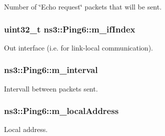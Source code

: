 Number of \char`\"{}\+Echo request\char`\"{} packets that will be sent. 

\subsubsection[{\texorpdfstring{m\+\_\+if\+Index}{m_ifIndex}}]{\setlength{\rightskip}{0pt plus 5cm}uint32\+\_\+t ns3\+::\+Ping6\+::m\+\_\+if\+Index\hspace{0.3cm}{\ttfamily [private]}}\hypertarget{classns3_1_1Ping6_a13e483e25f42538d74bebc41c31f2779}{}\label{classns3_1_1Ping6_a13e483e25f42538d74bebc41c31f2779}


Out interface (i.\+e. for link-\/local communication). 

\subsubsection[{\texorpdfstring{m\+\_\+interval}{m_interval}}]{ ns3\+::\+Ping6\+::m\+\_\+interval\hspace{0.3cm}{\ttfamily [private]}}\hypertarget{classns3_1_1Ping6_a9cc64d279cdfae296f88bce219af3c72}{}\label{classns3_1_1Ping6_a9cc64d279cdfae296f88bce219af3c72}


Intervall between packets sent. 

\subsubsection[{\texorpdfstring{m\+\_\+local\+Address}{m_localAddress}}]{ ns3\+::\+Ping6\+::m\+\_\+local\+Address\hspace{0.3cm}{\ttfamily [private]}}\hypertarget{classns3_1_1Ping6_a3d25a5fb60b248d4ad776a97f17cc0d4}{}\label{classns3_1_1Ping6_a3d25a5fb60b248d4ad776a97f17cc0d4}


Local address. 

